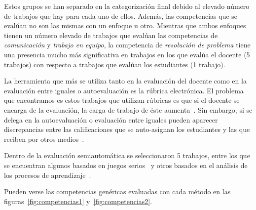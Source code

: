 Estos grupos se han separado en la categorización final debido al elevado número de trabajos que hay para cada uno de ellos. Además, las competencias que se evalúan no son las mismas con un enfoque u otro. Mientras que ambos enfoques tienen un número elevado de trabajos que evalúan las competencias de \emph{comunicación} y \emph{trabajo en equipo}, la competencia de \emph{resolución de problema} tiene una presencia mucho más significativa en trabajos en los que evalúa el docente (5 trabajos) con respecto a trabajos que evalúan los estudiantes (1 trabajo).

La herramienta que más se utiliza tanto en la evaluación del docente como en la evaluación entre iguales o autoevaluación es la rúbrica electrónica. El problema que encontramos es estos trabajos que utilizan rúbricas es que si el docente se encarga de la evaluación, la carga de trabajo de éste aumenta~\cite{lacuesta2009active}. Sin embargo, si se delega en la autoevaluación o evaluación entre iguales pueden aparecer discrepancias entre las calificaciones que se auto-asignan los estudiantes y las que reciben por otros medios~\cite{carreras2013promotion}. 

Dentro de la evaluación semiautomática se seleccionaron 5 trabajos, entre los que se encuentran algunos basados en juegos serios~\cite{djaouti2011classifying,bedek2011behavioral} y otros basados en el análisis de los procesos de aprendizaje~\cite{rayon2014web,fidalgo:2015}.

Pueden verse las competencias genéricas evaluadas con cada método en las figuras~\ref{fig:competencias1} y~\ref{fig:competencias2}.

